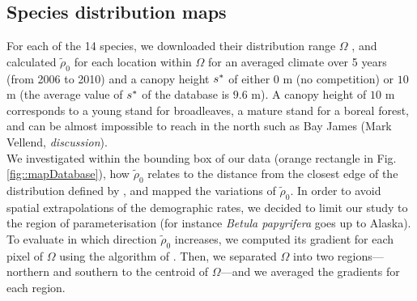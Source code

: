 \subsection{Species distribution maps}

For each of the 14 species, we downloaded their distribution range $ \Omega $
\citep{Prasad2003, Little1971}, and calculated $ \tilde \rho_0 $ for each
location within $ \Omega $ for an averaged climate over 5 years (from 2006 to
2010) and a canopy height $ {s}^{*} $ of either $ 0 $ m (no competition) or $ 10 $ m (the average value of $ {s}^{*} $ of the database is $ 9.6 $ m). A canopy height of $ 10 $ m corresponds to a young stand for broadleaves, a mature stand for a boreal forest, and can be almost impossible to reach in the north such as Bay James (Mark Vellend, \textit{discussion}). \\

We investigated within the bounding box of our data (orange rectangle in Fig. \ref{fig::mapDatabase}), how $ \tilde \rho_0 $ relates to the distance from the closest edge of the distribution defined by \citet{Little1971}, and mapped the variations of $ \tilde \rho_0 $. In order to avoid spatial extrapolations of the demographic rates, we decided to limit our study to the region of parameterisation (for instance \textit{Betula papyrifera} goes up to Alaska). To evaluate in which direction $ \tilde \rho_0 $ increases, we computed its gradient for each pixel of $ \Omega $ using the algorithm of \citet{Ritter1987}. Then, we separated $ \Omega $ into two regions---northern and southern to the centroid of $ \Omega $---and we averaged the gradients for each region. \\

